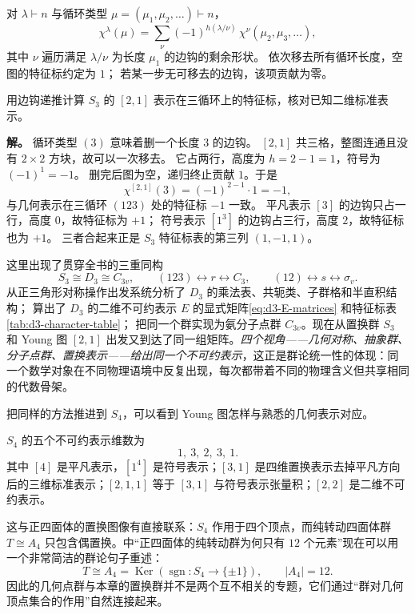 \begin{proposition}
对 $\lambda\vdash n$ 与循环类型 $\mu=(\mu_1,\mu_2,\dots)\vdash n$，
\[
\chi^\lambda(\mu)=\sum_{\nu}(-1)^{h(\lambda/\nu)}\,
\chi^\nu(\mu_2,\mu_3,\dots),
\]
其中 $\nu$ 遍历满足 $\lambda/\nu$ 为长度 $\mu_1$ 的边钩的剩余形状。
依次移去所有循环长度，空图的特征标约定为 $1$；
若某一步无可移去的边钩，该项贡献为零。
\end{proposition}

\begin{example}
用边钩递推计算 $S_3$ 的 $[2,1]$ 表示在三循环上的特征标，核对已知二维标准表示。

\textbf{解。} 循环类型 $(3)$ 意味着删一个长度 $3$ 的边钩。
$[2,1]$ 共三格，整图连通且没有 $2\times2$ 方块，故可以一次移去。
它占两行，高度为 $h=2-1=1$，符号为 $(-1)^1=-1$。
删完后图为空，递归终止贡献 $1$。于是
\[
\chi^{[2,1]}(3)=(-1)^{2-1}\cdot 1=-1,
\]
与几何表示在三循环 $(123)$ 处的特征标 $-1$ 一致。
平凡表示 $[3]$ 的边钩只占一行，高度 $0$，故特征标为 $+1$；
符号表示 $[1^3]$ 的边钩占三行，高度 $2$，故特征标也为 $+1$。
三者合起来正是 $S_3$ 特征标表的第三列 $(1,-1,1)$。
\end{example}

这里出现了贯穿全书的三重同构
\[
S_3\cong D_3\cong C_{3v},
\qquad
(123)\leftrightarrow r\leftrightarrow C_3,
\qquad
(12)\leftrightarrow s\leftrightarrow\sigma_v.
\]
 从正三角形对称操作出发系统分析了 $D_3$ 的乘法表、共轭类、子群格和半直积结构； 算出了 $D_3$ 的二维不可约表示 $E$ 的显式矩阵\cref{eq:d3-E-matrices} 和特征标表\cref{tab:d3-character-table}； 把同一个群实现为氨分子点群 $C_{3v}$。现在从置换群 $S_3$ 和 Young 图 $[2,1]$ 出发又到达了同一组矩阵。\emph{四个视角——几何对称、抽象群、分子点群、置换表示——给出同一个不可约表示}，这正是群论统一性的体现：同一个数学对象在不同物理语境中反复出现，每次都带着不同的物理含义但共享相同的代数骨架。

把同样的方法推进到 $S_4$，可以看到 Young 图怎样与熟悉的几何表示对应。

$S_4$ 的五个不可约表示维数为
\[
1,\ 3,\ 2,\ 3,\ 1.
\]
其中 $[4]$ 是平凡表示，$[1^4]$ 是符号表示；$[3,1]$ 是四维置换表示去掉平凡方向后的三维标准表示；$[2,1,1]$ 等于 $[3,1]$ 与符号表示张量积；$[2,2]$ 是二维不可约表示。

这与正四面体的置换图像有直接联系：$S_4$ 作用于四个顶点，而纯转动四面体群 $T\cong A_4$ 只包含偶置换。中“正四面体的纯转动群为何只有 $12$ 个元素”现在可以用一个非常简洁的群论句子重述：
\[
T\cong A_4=\operatorname{Ker}(\operatorname{sgn}:S_4\to\{\pm1\}),
\qquad |A_4|=12.
\]
因此的几何点群与本章的置换群并不是两个互不相关的专题，它们通过“群对几何顶点集合的作用”自然连接起来。

